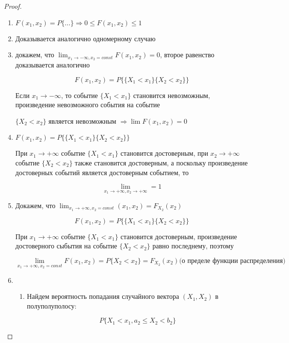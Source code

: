 \documentclass[a4paper, 14pt]{report}
\begin{document}
\begin{proof}
    \begin{enumerate}
        \item $F(x_1, x_2) = P\{ ... \} \Rightarrow 0 \le F(x_1, x_2) \le 1$
        \item Доказывается аналогично одномерному случаю
        \item докажем, что $\lim_{x_1 \to -\infty, x_2 = const} F(x_1, x_2) = 0$, второе равенство доказывается аналогично

            $$
            F(x_1, x_2) = P \{\{ X_1 < x_1 \} \{ X_2 < x_2 \}\}
            $$

            Если $x_1 \to -\infty$, то событие $\{X_1 < x_1\}$ становится невозможным, произведение невозможного события на событие 

            $\{X_2 < x_2\}$ является невозможным $\Rightarrow \lim F(x_1, x_2) = 0$

        \item $F(x_1, x_2) = P \{\{ X_1 < x_1 \}\{X_2 < x_2\}\}$

            При $x_1 \to +\infty$ событие $\{X_1 < x_1\}$ становится достоверным, при $x_2 \to +\infty$ событие $\{X_2 < x_2\}$ также становится достоверным, а поскольку произведение достоверных событий является достоверным событием, то

            $$
            \lim_{x_1 \to +\infty, x_2 \to +\infty} = 1
            $$

        \item Докажем, что $\lim_{x_1 \to +\infty, x_2 = const}(x_1, x_2) = F_{X_2}(x_2)$

            $$
            F(x_1, x_2) = P\{ \{ X_1 < x_1 \} \{ X_2 < x_2 \} \}
            $$

            При $x_1 \to +\infty$ событие $\{ X_1 < x_1 \}$ становится достоверным, произведение достоверного сыбытия на событие $\{X_2 < x_2\}$ равно последнему, поэтому

            $$
            \lim_{x_1 \to +\infty, x_2 = const} F(x_1, x_2) = P\{X_2 < x_2\} = F_{X_2} (x_2) \text{(о пределе функции распределения)}
            $$

        \item
            \begin{enumerate}
                \item Найдем вероятность попадания случайного вектора $(X_1, X_2)$ в полуполуполосу:

                    $$
                    P\{X_1 < x_1, a_2 \le X_2 < b_2\}
                    $$


\end{enumerate}
\end{enumerate}
\end{proof}
\end{document}
